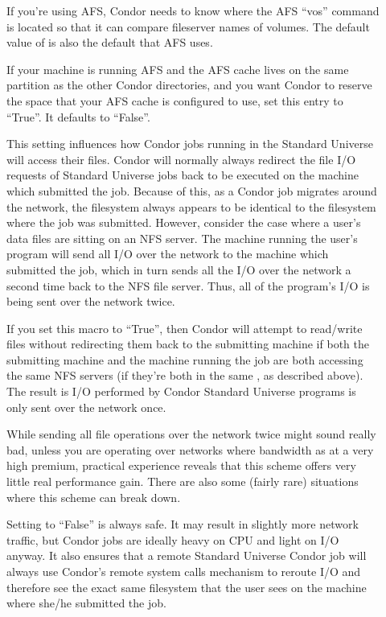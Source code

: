 \begin{description}
\item[] \label{param:VosPathname} If you're using
  AFS, Condor needs to know where the AFS ``vos'' command is located
  so that it can compare fileserver names of volumes.  The default
  value of  is also the default that AFS
  uses. 

\item[] \label{param:ReserveAfsCache} If
  your machine is running AFS and the AFS cache lives on the same
  partition as the other Condor directories, and you want Condor to
  reserve the space that your AFS cache is configured to use, set this
  entry to ``True''.  It defaults to ``False''.
  
\item[] \label{param:UseNfs} This setting influences
  how Condor jobs running in the Standard Universe will access their
  files.  Condor will normally always redirect the file I/O requests
  of Standard Universe jobs back to be executed on the machine which
  submitted the job.  Because of this, as a Condor job migrates around
  the network, the filesystem always appears to be identical to the
  filesystem where the job was submitted.  However, consider the case
  where a user's data files are sitting on an NFS server. The machine
  running the user's program will send all I/O over the network to the
  machine which submitted the job, which in turn sends all the I/O
  over the network a second time back to the NFS file server. Thus,
  all of the program's I/O is being sent over the network twice.
          
  If you set this macro to ``True'', then Condor will attempt to
  read/write files without redirecting them back to the submitting
  machine if both the submitting machine and the machine running the
  job are both accessing the same NFS servers (if they're both in the
  same , as described above).  The result is
  I/O performed by Condor Standard Universe programs is only sent over
  the network once.  
          
  While sending all file operations over the network twice might sound
  really bad, unless you are operating over networks where bandwidth
  as at a very high premium, practical experience reveals that this
  scheme offers very little real performance gain.  There are also
  some (fairly rare) situations where this scheme can break down.
  
  Setting  to ``False'' is always safe.  It may result
  in slightly more network traffic, but Condor jobs are ideally heavy
  on CPU and light on I/O anyway.  It also ensures that a remote
  Standard Universe Condor job will always use Condor's remote system
  calls mechanism to reroute I/O and therefore see the exact same
  filesystem that the user sees on the machine where she/he submitted
  the job.
  

\end{description}
